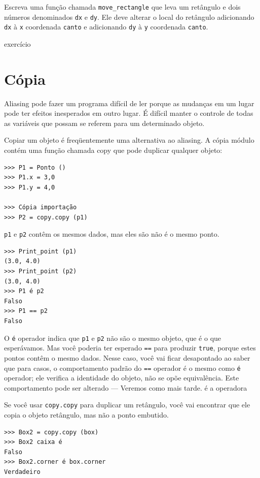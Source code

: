 \documentclass[10pt]{book}
\begin{document}
\begin{v erbatim}
{\begin{}
Escreva uma função chamada \verb "move_rectangle" que leva
um retângulo e dois números denominados {\tt dx} e {\tt dy}. Ele
deve alterar o local do retângulo adicionando {\tt dx}
à {\tt x} coordenada {\tt canto} e adicionando {\tt dy}
à {\tt y} coordenada {\tt canto}.

\end{} exercício


\section{Cópia}
\label{cópia}

Aliasing pode fazer um programa difícil de ler porque as mudanças
em um lugar pode ter efeitos inesperados em outro lugar.
É difícil manter o controle de todas as variáveis ​​que possam se referem
para um determinado objeto.

Copiar um objeto é freqüentemente uma alternativa ao aliasing.
A cópia {\tt} módulo contém uma função chamada {copy \tt} que
pode duplicar qualquer objeto:

\begin{verbatim}
>>> P1 = Ponto ()
>>> P1.x = 3,0
>>> P1.y = 4,0

>>> Cópia importação
>>> P2 = copy.copy (p1)
\end{verbatim}
%
{\tt p1} e {\tt p2} contêm os mesmos dados, mas eles são
não é o mesmo ponto.

\begin{verbatim}
>>> Print_point (p1)
(3.0, 4.0)
>>> Print_point (p2)
(3.0, 4.0)
>>> P1 é p2
Falso
>>> P1 == p2
Falso
\end{verbatim}
%
O {\tt é} operador indica que {\tt p1} e {\tt p2} não são o
mesmo objeto, que é o que esperávamos. Mas você poderia ter esperado
{\tt ==} para produzir {\tt true}, porque estes pontos contêm o mesmo
dados. Nesse caso, você vai ficar desapontado ao saber que para
casos, o comportamento padrão do {\tt ==} operador é o mesmo
como {\tt é} operador; ele verifica a identidade do objeto, não se opõe
equivalência. Este comportamento pode ser alterado --- Veremos como mais tarde.
\index{} é a operadora

Se você usar {\tt copy.copy} para duplicar um retângulo, você vai encontrar
que ele copia o objeto retângulo, mas não a ponto embutido.

\begin{verbatim}
>>> Box2 = copy.copy (box)
>>> Box2 caixa é
Falso
>>> Box2.corner é box.corner
Verdadeiro
\end{verbatim}

}
\end{v erbatim}
\end{document}
